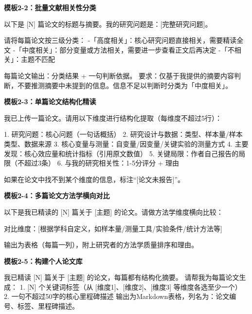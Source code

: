 \textbf{模板2-2：批量文献相关性分类}

\begin{tcolorbox}[promptbox]
以下是 [N] 篇论文的标题与摘要。我的研究问题是：[完整研究问题]。

请将每篇论文按三级分类：
-「高度相关」：核心研究问题直接相关，需要精读全文
-「中度相关」：部分变量或方法相关，需要进一步查看正文后再决定
-「不相关」：主题不匹配

每篇论文输出：分类结果 + 一句判断依据。
要求：仅基于我提供的摘要内容判断，不要推测摘要中未提到的信息。信息不足以判断时分类为「中度相关」。
\end{tcolorbox}

\textbf{模板2-3：单篇论文结构化精读}

\begin{tcolorbox}[promptbox]
我已上传一篇论文。请用以下维度进行结构化提取（每维度不超过5行）：

1. 研究问题：核心问题（一句话概括）
2. 研究设计与数据：类型、样本量/样本类型、数据来源
3. 核心变量与测量：自变量/因变量/关键实验的测量方式
4. 主要发现：核心效应量和统计指标（引用原文数值）
5. 关键局限：作者自己报告的局限（不超过3条）
6. 与我的研究相关性：1-5分评分 + 理由

如果在论文中找不到某个维度的信息，标注``[论文未报告]''。
\end{tcolorbox}

\textbf{模板2-4：多篇论文方法学横向对比}

\begin{tcolorbox}[promptbox]
以下是我已精读的 [N] 篇关于 [主题] 的论文。请做方法学维度横向比较：

对比维度：[根据学科自定义，如样本量/测量工具/实验条件/统计方法等]

输出为表格（每篇一列），附上研究者的方法学质量排序和理由。
\end{tcolorbox}

\textbf{模板2-5：构建个人论文库}

\begin{tcolorbox}[promptbox]
我已精读 [N] 篇关于 [主题] 的论文，每篇都有结构化摘要。
请帮我为每篇论文生成：
1. [N] 个关键词标签（从 [维度1]、[维度2]、[维度3] 等维度各选至少一个）
2. 一句不超过50字的核心里程碑描述
输出为Markdown表格，列名为：论文编号、标签、里程碑描述。
\end{tcolorbox}



